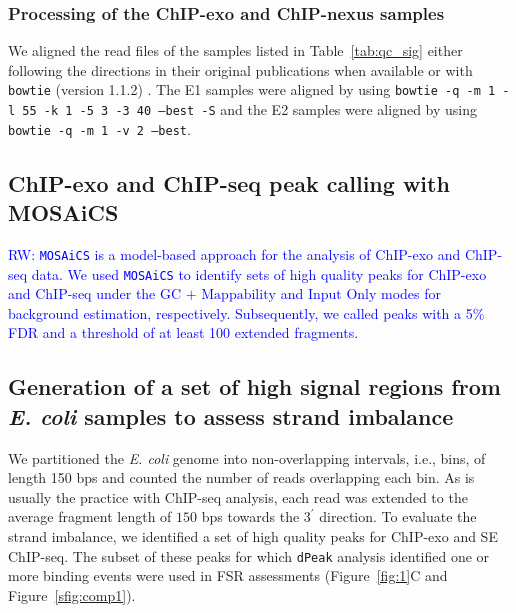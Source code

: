 \documentclass{bmcart}
\newcommand{\SK}[1]{\textcolor{red}{SK: #1}}
\newcommand{\RW}[1]{\textcolor{blue}{RW: #1}}
\newcommand{\sig}{\sigma^{70}}
\begin{document}
\subsubsection*{Processing of the ChIP-exo and ChIP-nexus samples}

We aligned the read files of the samples listed in
Table~\ref{tab:qc_sig} either following the directions in their
original publications when available or with \texttt{bowtie} (version
1.1.2) \cite{bowtie}. The E1 samples were aligned by using
\texttt{bowtie -q -m 1 -l 55 -k 1 -5 3 -3 40 --best -S} and the E2
samples were aligned by using \texttt{bowtie -q -m 1 -v 2 --best}.



\subsection*{ChIP-exo and ChIP-seq peak calling with MOSAiCS}

\RW{ \texttt{MOSAiCS} \cite{mosaics} is a model-based approach for the
  analysis of ChIP-exo and ChIP-seq data. We used \texttt{MOSAiCS} to
  identify sets of high quality peaks for ChIP-exo and ChIP-seq under
  the $\mbox{GC + Mappability}$ and $\mbox{Input Only}$ modes for
  background estimation, respectively. Subsequently, we called peaks
  with a 5\% FDR and a threshold of at least 100 extended fragments.}

\subsection*{Generation of a set of high signal regions from
  \textit{E. coli} samples to assess strand imbalance}


We partitioned the \textit{E. coli} genome into non-overlapping
intervals, i.e., bins, of length 150 bps and counted the number of
reads overlapping each bin. As is usually the practice with ChIP-seq
analysis, each read was extended to the average fragment length of
$150$ bps towards the $3^{\prime}$ direction. To evaluate the strand
imbalance, we identified a set of high quality peaks for ChIP-exo and
SE ChIP-seq. The subset of these peaks for which \texttt{dPeak}
analysis identified one or more binding events were used in FSR
assessments (Figure~\ref{fig:1}C and Figure~\ref{sfig:comp1}).
\end{document}
